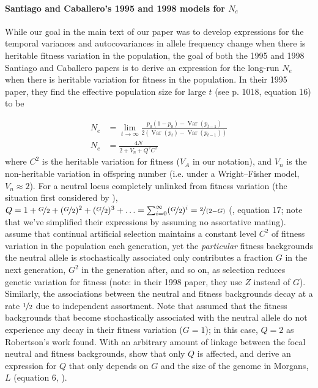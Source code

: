 \documentclass[11pt]{article}
\DeclareMathOperator{\var}{Var}
\begin{document}
\paragraph{Santiago and Caballero's 1995 and 1998 models for $N_e$}

While our goal in the main text of our paper was to develop expressions for the
temporal variances and autocovariances in allele frequency change when there is
heritable fitness variation in the population, the goal of both the 1995 and
1998 Santiago and Caballero papers is to derive an expression for the long-run
$N_e$ when there is heritable variation for fitness in the population. In their
1995 paper, they find the effective population size for large $t$ (see p. 1018,
equation 16) to be

\begin{align}
  N_e &= \lim_{t \to \infty} \frac{p_0(1-p_0) - \var(p_{t-1})}{2(\var(p_t) - \var(p_{t-1}))}  \\
  N_e &= \frac{4N}{2 + V_n + Q^2 C^2}
\end{align}
%
where $C^2$ is the heritable variation for fitness ($V_A$ in our notation), and
$V_n$ is the non-heritable variation in offspring number (i.e. under a
Wright--Fisher model, $V_n \approx 2$). For a neutral locus completely unlinked
from fitness variation (the situation first considered by
\cite{Robertson1961-ho}), $Q = 1 + \nicefrac{G}{2} + (\nicefrac{G}{2})^2 +
(\nicefrac{G}{2})^3 + \ldots = \sum_{i=0}^\infty (\nicefrac{G}{2})^i =
\nicefrac{2}{(2 - G)}$ (\cite{Santiago1995-hx}, equation 17; note that we've
simplified their expressions by assuming no assortative mating).
\textcite{Santiago1995-hx} assume that continual artificial selection maintains
a constant level $C^2$ of fitness variation in the population each generation,
yet the \emph{particular} fitness backgrounds the neutral allele is
stochastically associated only contributes a fraction $G$ in the next
generation, $G^2$ in the generation after, and so on, as selection reduces
genetic variation for fitness (note: in their 1998 paper, they use $Z$ instead
of $G$). Similarly, the associations between the neutral and fitness
backgrounds decay at a rate $\nicefrac{1}{2}$ due to independent assortment.
Note that \textcite{Robertson1961-ho} assumed that the fitness backgrounds that
become stochastically associated with the neutral allele do not experience any
decay in their fitness variation ($G=1$); in this case, $Q = 2$ as Robertson's
work found. With an arbitrary amount of linkage between the focal neutral and
fitness backgrounds, \textcite{Santiago1998-bs} show that only $Q$ is affected,
and derive an expression for $Q$ that only depends on $G$ and the size of the
genome in Morgans, $L$ (equation 6, \citeyear{Santiago1998-bs}). 
\end{document}
